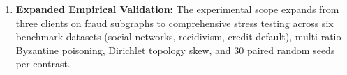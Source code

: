 \begin{enumerate}[leftmargin=*]
    \item \textbf{Expanded Empirical Validation:} The experimental scope expands from three clients on fraud subgraphs to comprehensive stress testing across six benchmark datasets (social networks, recidivism, credit default), multi-ratio Byzantine poisoning, Dirichlet topology skew, and 30 paired random seeds per contrast.
\end{enumerate}
